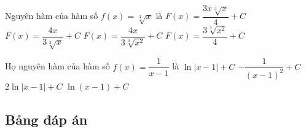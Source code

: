 \begin{ex}%
	Nguyên hàm của hàm số $f(x)=\sqrt[3]{x}$ là
	\choice
	{\True $F(x)=\dfrac{3x\sqrt[3]{x}}{4}+C$}
	{$F(x)=\dfrac{4x}{3\sqrt[3]{x}}+C$}
	{$F(x)=\dfrac{4x}{3\sqrt[3]{x^2}}+C$}
	{$F(x)=\dfrac{3\sqrt[3]{x^2}}{4}+C$}
\end{ex}

\begin{ex}%
	Họ nguyên hàm của hàm số $ f(x)=\dfrac{1}{x-1}$ là
	\choice
	{\True $\ln\left|x-1\right|+C$}
	{$-\dfrac{1}{\left(x-1\right)^2}+C$}
	{$ 2\ln\left|x-1\right|+C$}
	{$\ln\left(x-1\right)+C$}
\end{ex}
\subsection{Bảng đáp án}


